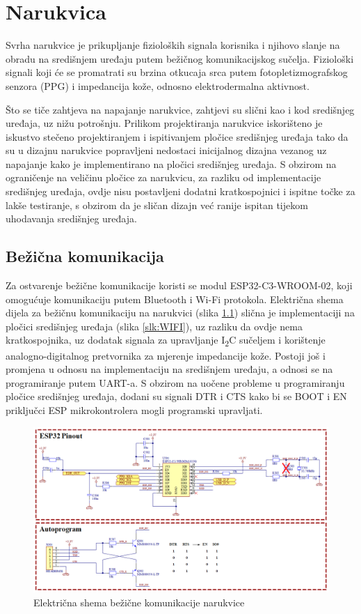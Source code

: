 \chapter{Narukvica}
\label{pog:bracelet}
Svrha narukvice je prikupljanje fizioloških signala korisnika i njihovo slanje na obradu na središnjem uređaju putem bežičnog komunikacijskog sučelja. Fiziološki signali koji će se promatrati su brzina otkucaja srca putem fotopletizmografskog senzora (PPG) i impedancija kože, odnosno elektrodermalna aktivnost.

Što se tiče zahtjeva na napajanje narukvice, zahtjevi su slični kao i kod središnjeg uređaja, uz nižu potrošnju. Prilikom projektiranja narukvice iskorišteno je iskustvo stečeno projektiranjem i ispitivanjem pločice središnjeg uređaja tako da su u dizajnu narukvice popravljeni nedostaci inicijalnog dizajna vezanog uz napajanje kako je implementirano na pločici središnjeg uređaja. S obzirom na ograničenje na veličinu pločice za narukvicu, za razliku od implementacije središnjeg uređaja, ovdje nisu postavljeni dodatni kratkospojnici i ispitne točke za lakše testiranje, s obzirom da je sličan dizajn već ranije ispitan tijekom uhodavanja središnjeg uređaja.

\section{Bežična komunikacija}
Za ostvarenje bežične komunikacije koristi se modul ESP32-C3-WROOM-02, koji omogućuje komunikaciju putem Bluetooth i Wi-Fi protokola. Električna shema dijela za bežičnu komunikaciju na narukvici (slika \ref{slk:BR_WIRELESS}) slična je implementaciji na pločici središnjeg uređaja (slika \ref{slk:WIFI}), uz razliku da ovdje nema kratkospojnika, uz dodatak signala za upravljanje I\textsubscript{2}C sučeljem i korištenje analogno-digitalnog pretvornika za mjerenje impedancije kože. Postoji još i promjena u odnosu na implementaciju na središnjem uređaju, a odnosi se na programiranje putem UART-a. S obzirom na uočene probleme u programiranju pločice središnjeg uređaja, dodani su signali DTR i CTS kako bi se BOOT i EN priključci ESP mikrokontrolera mogli programski upravljati.
\begin{figure}
    \centering
    \includegraphics[width=1\textwidth]{Figures/BR_WIRELESS.png}
    \caption{Električna shema bežične komunikacije narukvice}
    \label{slk:BR_WIRELESS}
\end{figure}

